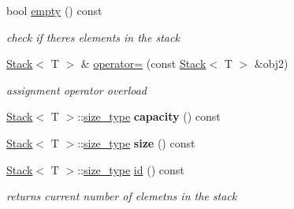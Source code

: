 \begin{DoxyCompactItemize}
bool \hyperlink{class_my_namespace_1_1_stack_ab76cbabd546dc4ab2859797676ae1a71}{empty} () const
\begin{DoxyCompactList}\small\item\em check if there\textquotesingle{}s elements in the stack \end{DoxyCompactList}\item 
\mbox{\label{class_my_namespace_1_1_stack_a60681a9f6b9a2463b84c358cf828e61a}} 
\hyperlink{class_my_namespace_1_1_stack}{Stack}$<$ T $>$ \& \hyperlink{class_my_namespace_1_1_stack_a60681a9f6b9a2463b84c358cf828e61a}{operator=} (const \hyperlink{class_my_namespace_1_1_stack}{Stack}$<$ T $>$ \&obj2)
\begin{DoxyCompactList}\small\item\em assignment operator overload \end{DoxyCompactList}\item 
\mbox{\label{class_my_namespace_1_1_stack_afb24b569ca5f49f103daa0bc7cedfff9}} 
\hyperlink{class_my_namespace_1_1_stack}{Stack}$<$ T $>$\+::\hyperlink{class_my_namespace_1_1_stack_a19c43f92e11d91ed645058833af88a86}{size\+\_\+type} {\bfseries capacity} () const
\item 
\mbox{\label{class_my_namespace_1_1_stack_a099973da412b2b06b21cf93271ca8069}} 
\hyperlink{class_my_namespace_1_1_stack}{Stack}$<$ T $>$\+::\hyperlink{class_my_namespace_1_1_stack_a19c43f92e11d91ed645058833af88a86}{size\+\_\+type} {\bfseries size} () const
\item 
\mbox{\label{class_my_namespace_1_1_stack_a3d138862d673881326eff612c8b1df08}} 
\hyperlink{class_my_namespace_1_1_stack}{Stack}$<$ T $>$\+::\hyperlink{class_my_namespace_1_1_stack_a19c43f92e11d91ed645058833af88a86}{size\+\_\+type} \hyperlink{class_my_namespace_1_1_stack_a3d138862d673881326eff612c8b1df08}{id} () const
\begin{DoxyCompactList}\small\item\em returns current number of elemetns in the stack \end{DoxyCompactList}\end{DoxyCompactItemize}
